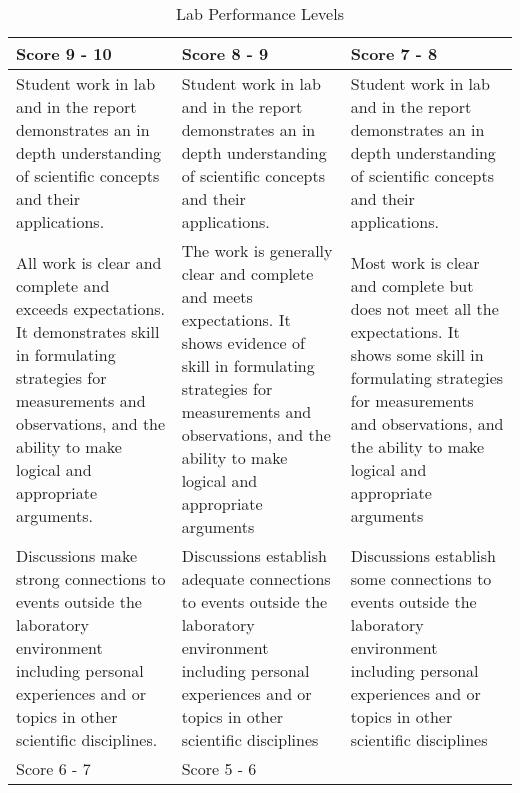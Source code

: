 \begin{table*} \caption{Lab Performance Levels} \label{t:performance}
\centering
\begin{tabular}{p{2in}p{2in}p{2in}} \toprule
Score 9 - 10		&Score 8 - 9		&Score 7 - 8\\
\midrule
Student work in lab and in the report demonstrates an in depth understanding of scientific concepts and their applications.
	&Student work in lab and in the report demonstrates an in depth understanding of scientific concepts and their applications.
	&Student work in lab and in the report demonstrates an in depth understanding of scientific concepts and their applications.\\
	\midrule
All work is clear and complete and exceeds expectations. It demonstrates skill in formulating strategies for measurements and observations, and the ability to make logical and appropriate arguments.
	&The work is generally clear and complete and meets expectations. It shows evidence of skill in formulating strategies for measurements and observations, and the ability to make logical and appropriate arguments
	&Most work is clear and complete but does not meet all the expectations. It shows some skill in formulating strategies for measurements and observations, and the ability to make logical and appropriate arguments\\
	\midrule
Discussions make strong connections to events outside the laboratory environment including personal experiences and or topics in other scientific disciplines.
	&Discussions establish adequate connections to events outside the laboratory environment including personal experiences and or topics in other scientific disciplines
	&Discussions establish some connections to events outside the laboratory environment including personal experiences and or topics in other scientific disciplines\\

\bottomrule
	
Score 6 - 7
&Score 5 - 6\\ \midrule


\end{tabular}
\end{table*}
